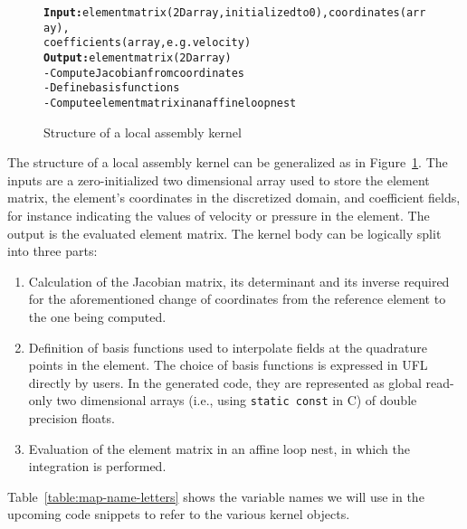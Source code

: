 
\begin{figure}
\begin{alltt}
\scriptsize
\textbf{Input:} element matrix (2D array, initialized to 0), coordinates (array), 
       coefficients (array, e.g. velocity)
\textbf{Output:} element matrix (2D array)
- Compute Jacobian from coordinates
- Define basis functions
- Compute element matrix in an affine loop nest
\end{alltt}
\caption{Structure of a local assembly kernel}
\label{code:general-structure}
\end{figure}


The structure of a local assembly kernel can be generalized as in Figure~\ref{code:general-structure}. The inputs are a zero-initialized two dimensional array used to store the element matrix, the element's coordinates in the discretized domain, and coefficient fields, for instance indicating the values of velocity or pressure in the element. The output is the evaluated element matrix. The kernel body can be logically split into three parts:
\begin{enumerate}
  \item Calculation of the Jacobian matrix, its determinant and its
    inverse required for the aforementioned change of coordinates from
    the reference element to the one being computed.
  \item Definition of basis functions used to interpolate fields at the
    quadrature points in the element. The choice of basis functions is
    expressed in UFL directly by users. In the generated code, they are
    represented as global read-only two dimensional arrays (i.e., using
    \texttt{static const} in C) of double precision floats.
  \item Evaluation of the element matrix in an affine loop nest, in which
    the integration is performed.
\end{enumerate}
Table~\ref{table:map-name-letters} shows the variable names we will use in the upcoming code snippets to refer to the various kernel objects.

